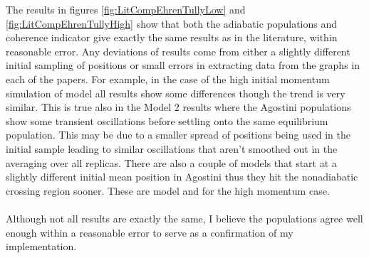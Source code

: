 The results in figures \ref{fig:LitCompEhrenTullyLow} and \ref{fig:LitCompEhrenTullyHigh} show that both the adiabatic populations and coherence indicator give exactly the same results as in the literature, within reasonable error. Any deviations of results come from either a slightly different initial sampling of positions or small errors in extracting data from the graphs in each of the papers. For example, in the case of the high initial momentum simulation of model  all  results show some differences though the trend is very similar. This is true also in the Model 2 results where the Agostini populations show some transient oscillations before settling onto the same equilibrium population. This may be due to a smaller spread of positions being used in the initial sample leading to similar oscillations that aren't smoothed out in the averaging over all replicas. There are also a couple of models that start at a slightly different initial mean position in Agostini \cite{agostini_quantum-classical_2016} thus they hit the nonadiabatic crossing region sooner. These are model  and  for the high momentum case.
\\\\
Although not all results are exactly the same, I believe the populations agree well enough within a reasonable error to serve as a confirmation of my implementation.
